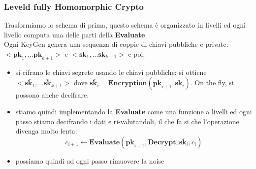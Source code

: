 \documentclass[12pt, oneside]{extbook} %
\begin{document}
\subsubsection{Leveld fully Homomorphic Crypto}
Trasformiamo lo schema di prima, questo schema è organizzato in livelli ed ogni livello computa una delle parti della \textbf{Evaluate}.\\Ogni KeyGen genera una sequenza di coppie di chiavi pubbliche e private: $< \textbf{pk}_1,...\textbf{pk}_{k+1} >$ e $< \textbf{sk}_1,...\textbf{sk}_{k+1} >$ e poi:
\begin{itemize}
	\item si cifrano le chiavi segrete usando le chiavi pubbliche:
	si ottiene $< \bar{\textbf{sk}_1},...\bar{\textbf{sk}}_{k+1} >$ dove $\bar{\textbf{sk}_i} = \textbf{Encryption}(\textbf{pk}_{i+1}, \textbf{sk}_i)$. On the fly, si possono anche decifrare.
	\item stiamo quindi implementando la \textbf{Evaluate} come una funzione a livelli ed ogni passo stiamo decifrando i dati e ri-valutandoli, il che fa si che l'operazione divenga molto lenta:\\
	\begin{equation}
		c_{i+1} \leftarrow \textbf{Evaluate}(\textbf{pk}_{i+1}, \textbf{Decrypt}, \bar{\textbf{sk}_i}, c_i)
	\end{equation}
	\item possiamo quindi ad ogni passo rimuovere la noise
\end{itemize}
\end{document}

